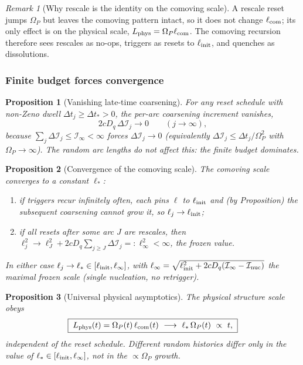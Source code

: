 \documentclass[11pt,a4paper]{article}
\newcommand{\Op}{\Omega_P}
\newcommand{\Dq}{D_q}
\newcommand{\lc}{\ell_{\rm com}}
\newcommand{\Lp}{L_{\rm phys}}
\newcommand{\linit}{\ell_{\rm init}}
\newcommand{\Ib}{\mathcal I}
\theoremstyle{plain}
\newtheorem{proposition}{Proposition}[section]
\theoremstyle{definition}
\theoremstyle{remark}
\newtheorem{remark}{Remark}[section]
\begin{document}
\begin{remark}[Why rescale is the identity on the comoving scale]
A rescale reset jumps $\Op$ but leaves the comoving pattern intact, so it does not change $\lc$; its only
effect is on the physical scale, $\Lp=\Op\lc$. The comoving recursion therefore sees rescales as
no-ops, triggers as resets to $\linit$, and quenches as dissolutions.
\end{remark}

\subsubsection{Finite budget forces convergence}

\begin{proposition}[Vanishing late-time coarsening]
For any reset schedule with non-Zeno dwell $\Delta t_j\ge\Delta t_\ast>0$, the per-arc coarsening
increment vanishes,
\begin{equation}
2c\Dq\,\Delta\Ib_j\to0\qquad(j\to\infty),
\end{equation}
because $\sum_j\Delta\Ib_j\le\Ib_\infty<\infty$ forces $\Delta\Ib_j\to0$ (equivalently
$\Delta\Ib_j\le\Delta t_j/\Op^2$ with $\Op\to\infty$). The random arc lengths do not affect this:
the finite budget dominates.
\end{proposition}

\begin{proposition}[Convergence of the comoving scale]
The comoving scale converges to a constant $\ell_\ast$:
\begin{enumerate}[label=(\roman*),leftmargin=1.8em,itemsep=2pt]
\item if triggers recur infinitely often, each pins $\ell$ to $\linit$ and (by
Proposition) the subsequent coarsening cannot grow it, so $\ell_j\to\linit$;
\item if all resets after some arc $J$ are rescales, then
$\ell_j^{2}\to\ell_J^{2}+2c\Dq\!\sum_{j\ge J}\Delta\Ib_j=:\ell_\infty^{2}<\infty$, the frozen value.
\end{enumerate}
In either case $\ell_j\to\ell_\ast\in[\linit,\ell_\infty]$, with
$\ell_\infty=\sqrt{\linit^{2}+2c\Dq(\Ib_\infty-\Ib_{\rm nuc})}$ the maximal frozen scale (single
nucleation, no retrigger).
\end{proposition}

\begin{proposition}[Universal physical asymptotics]
The physical structure scale obeys
\begin{equation}
\boxed{\;\Lp(t)=\Op(t)\,\lc(t)\ \longrightarrow\ \ell_\ast\,\Op(t)\ \propto\ t,\;}
\end{equation}
independent of the reset schedule. Different random histories differ only in the value of
$\ell_\ast\in[\linit,\ell_\infty]$, not in the $\propto\Op$ growth.
\end{proposition}
\end{document}
